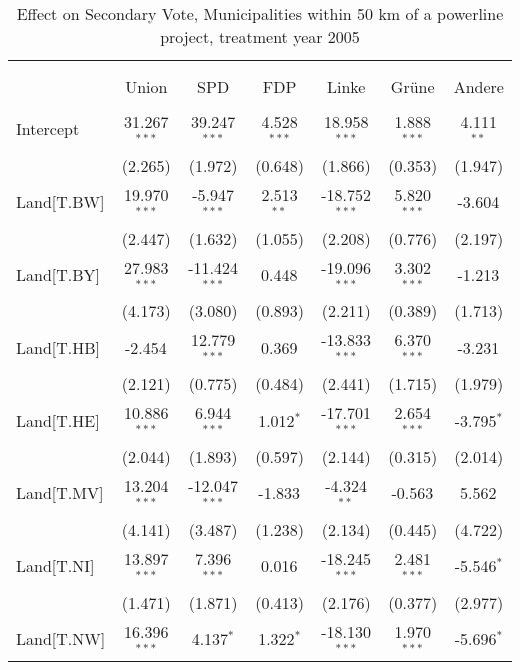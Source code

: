 \begin{table}[!htbp] \centering
  \caption{Effect on Secondary Vote, Municipalities within 50 km of a powerline project, treatment year 2005}
\begin{tabular}{@{\extracolsep{5pt}}lcccccc}
\\[-1.8ex]\hline
\hline \\[-1.8ex]
\\[-1.8ex] & \multicolumn{1}{c}{Union} & \multicolumn{1}{c}{SPD} & \multicolumn{1}{c}{FDP} & \multicolumn{1}{c}{Linke} & \multicolumn{1}{c}{Grüne} & \multicolumn{1}{c}{Andere}  \\
\hline \\[-1.8ex]
 Intercept & 31.267$^{***}$ & 39.247$^{***}$ & 4.528$^{***}$ & 18.958$^{***}$ & 1.888$^{***}$ & 4.111$^{**}$ \\
  & (2.265) & (1.972) & (0.648) & (1.866) & (0.353) & (1.947) \\
 Land[T.BW] & 19.970$^{***}$ & -5.947$^{***}$ & 2.513$^{**}$ & -18.752$^{***}$ & 5.820$^{***}$ & -3.604$^{}$ \\
  & (2.447) & (1.632) & (1.055) & (2.208) & (0.776) & (2.197) \\
 Land[T.BY] & 27.983$^{***}$ & -11.424$^{***}$ & 0.448$^{}$ & -19.096$^{***}$ & 3.302$^{***}$ & -1.213$^{}$ \\
  & (4.173) & (3.080) & (0.893) & (2.211) & (0.389) & (1.713) \\
 Land[T.HB] & -2.454$^{}$ & 12.779$^{***}$ & 0.369$^{}$ & -13.833$^{***}$ & 6.370$^{***}$ & -3.231$^{}$ \\
  & (2.121) & (0.775) & (0.484) & (2.441) & (1.715) & (1.979) \\
 Land[T.HE] & 10.886$^{***}$ & 6.944$^{***}$ & 1.012$^{*}$ & -17.701$^{***}$ & 2.654$^{***}$ & -3.795$^{*}$ \\
  & (2.044) & (1.893) & (0.597) & (2.144) & (0.315) & (2.014) \\
 Land[T.MV] & 13.204$^{***}$ & -12.047$^{***}$ & -1.833$^{}$ & -4.324$^{**}$ & -0.563$^{}$ & 5.562$^{}$ \\
  & (4.141) & (3.487) & (1.238) & (2.134) & (0.445) & (4.722) \\
 Land[T.NI] & 13.897$^{***}$ & 7.396$^{***}$ & 0.016$^{}$ & -18.245$^{***}$ & 2.481$^{***}$ & -5.546$^{*}$ \\
  & (1.471) & (1.871) & (0.413) & (2.176) & (0.377) & (2.977) \\
 Land[T.NW] & 16.396$^{***}$ & 4.137$^{*}$ & 1.322$^{*}$ & -18.130$^{***}$ & 1.970$^{***}$ & -5.696$^{*}$ \\

\end{tabular}
\end{table}
